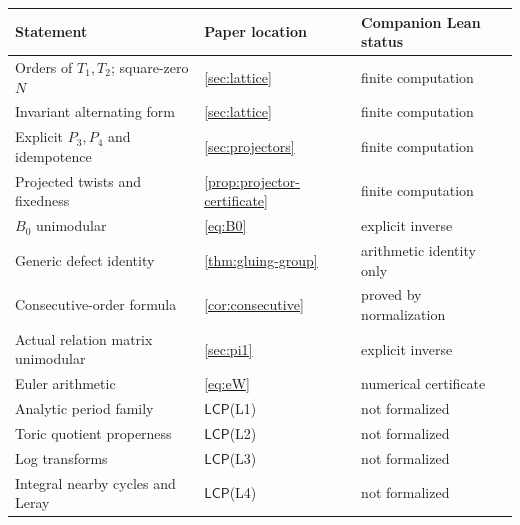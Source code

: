 \documentclass[11pt,reqno]{amsart}
\numberwithin{equation}{section}
\newcommand{\LCP}{\mathsf{LCP}}
\theoremstyle{definition}
\begin{document}
\begin{center}
\small
\begin{tabularx}{\textwidth}{@{}X>{\raggedright\arraybackslash}p{}>{\raggedright\arraybackslash}p{}@{}}
\toprule
Statement & Paper location & Companion Lean status\\
\midrule
Orders of $T_1,T_2$; square-zero $N$ & \cref{sec:lattice} & finite computation\\
Invariant alternating form & \cref{sec:lattice} & finite computation\\
Explicit $P_3,P_4$ and idempotence & \cref{sec:projectors} & finite computation\\
Projected twists and fixedness & \cref{prop:projector-certificate} & finite computation\\
$B_0$ unimodular & \cref{eq:B0} & explicit inverse\\
Generic defect identity & \cref{thm:gluing-group} & arithmetic identity only\\
Consecutive-order formula & \cref{cor:consecutive} & proved by normalization\\
Actual relation matrix unimodular & \cref{sec:pi1} & explicit inverse\\
Euler arithmetic & \cref{eq:eW} & numerical certificate\\
Analytic period family & $\LCP$(L1) & not formalized\\
Toric quotient properness & $\LCP$(L2) & not formalized\\
Log transforms & $\LCP$(L3) & not formalized\\
Integral nearby cycles and Leray & $\LCP$(L4) & not formalized\\
\bottomrule
\end{tabularx}
\end{center}
\end{document}
